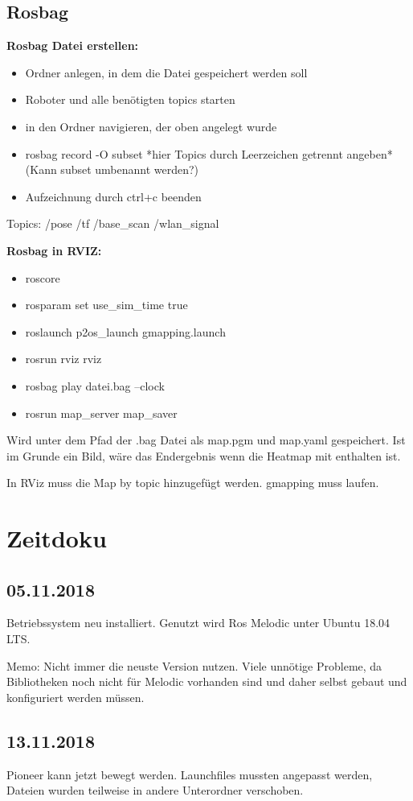 \documentclass{scrartcl}%
\begin{document}
\subsection{Rosbag}
\textbf{Rosbag Datei erstellen:}
\begin{itemize}
	\item Ordner anlegen, in dem die Datei gespeichert werden soll
	\item Roboter und alle benötigten topics starten
	\item in den Ordner navigieren, der oben angelegt wurde
	\item rosbag record -O subset *hier Topics durch Leerzeichen getrennt angeben* (Kann subset umbenannt werden?)
	\item Aufzeichnung durch ctrl+c beenden
\end{itemize}
Topics: /pose /tf /base\_scan /wlan\_signal

\textbf{Rosbag in RVIZ:}
\begin{itemize}
	\item roscore
	\item rosparam set use\_sim\_time true
	\item roslaunch p2os\_launch gmapping.launch
	\item rosrun rviz rviz
	\item rosbag play datei.bag --clock
	\item rosrun map\_server map\_saver
\end{itemize}
Wird unter dem Pfad der .bag Datei als map.pgm und map.yaml gespeichert. Ist im Grunde ein Bild, wäre das Endergebnis wenn die Heatmap mit enthalten ist.

In RViz muss die Map by topic hinzugefügt werden. gmapping muss laufen.

\section{Zeitdoku}
\subsection{05.11.2018}
Betriebssystem neu installiert. Genutzt wird Ros Melodic unter Ubuntu 18.04 LTS.

Memo: Nicht immer die neuste Version nutzen. Viele unnötige Probleme, da Bibliotheken noch nicht für Melodic vorhanden sind und daher selbst gebaut und konfiguriert werden müssen.

\subsection{13.11.2018}
Pioneer kann jetzt bewegt werden. Launchfiles mussten angepasst werden, Dateien wurden teilweise in andere Unterordner verschoben.
\end{document}
